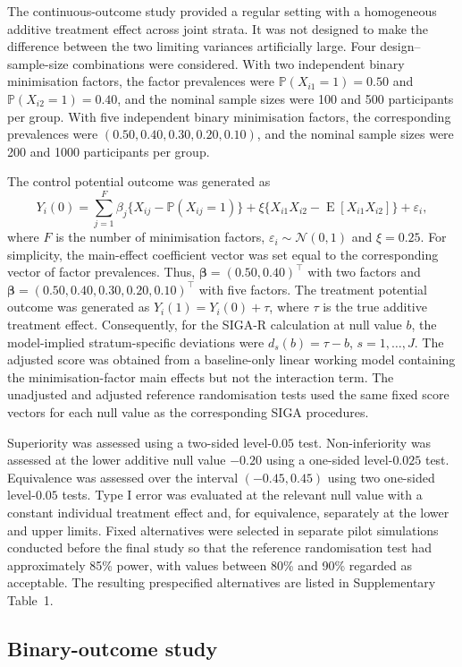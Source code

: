 \documentclass[12pt,a4paper]{article}
\theoremstyle{definition}
\theoremstyle{remark}\newtheorem{remark}{Remark}
\numberwithin{equation}{section}
\newcommand{\E}{\operatorname{E}}
\newcommand{\Pbb}{\mathbb P}
\begin{document}
The continuous-outcome study provided a regular setting with a homogeneous additive treatment effect across joint strata. It was not designed to make the difference between the two limiting variances artificially large. Four design--sample-size combinations were considered. With two independent binary minimisation factors, the factor prevalences were $\Pbb(X_{i1}=1)=0.50$ and $\Pbb(X_{i2}=1)=0.40$, and the nominal sample sizes were 100 and 500 participants per group. With five independent binary minimisation factors, the corresponding prevalences were
$(0.50,0.40,0.30,0.20,0.10)$, and the nominal sample sizes were 200 and 1000 participants per group.

The control potential outcome was generated as
\[
Y_i(0)
=
\sum_{j=1}^F
\beta_j\{X_{ij}-\Pbb(X_{ij}=1)\}
+
\xi\{X_{i1}X_{i2}-\E[X_{i1}X_{i2}]\}
+
\varepsilon_i,
\]
where $F$ is the number of minimisation factors, $\varepsilon_i\sim\mathcal N(0,1)$ and $\xi=0.25$. For simplicity, the main-effect coefficient vector was set equal to the corresponding vector of factor prevalences. Thus, $\bm\beta=(0.50,0.40)^\top$ with two factors and
$\bm\beta=(0.50,0.40,0.30,0.20,0.10)^\top$ with five factors. The treatment potential outcome was generated as $Y_i(1)=Y_i(0)+\tau$, where $\tau$ is the true additive treatment effect. Consequently, for the SIGA-R calculation at null value $b$, the model-implied stratum-specific deviations were $d_s(b)=\tau-b$, $s=1,\ldots,J$. The adjusted score was obtained from a baseline-only linear working model containing the minimisation-factor main effects but not the interaction term. The unadjusted and adjusted reference randomisation tests used the same fixed score vectors for each null value as the corresponding SIGA procedures.

Superiority was assessed using a two-sided level-$0.05$ test. Non-inferiority was assessed at the lower additive null value $-0.20$ using a one-sided level-$0.025$ test. Equivalence was assessed over the interval $(-0.45,0.45)$ using two one-sided level-$0.05$ tests. Type I error was evaluated at the relevant null value with a constant individual treatment effect and, for equivalence, separately at the lower and upper limits. Fixed alternatives were selected in separate pilot simulations conducted before the final study so that the reference randomisation test had approximately 85\% power, with values between 80\% and 90\% regarded as acceptable. The resulting prespecified alternatives are listed in Supplementary Table~1.

\subsection{Binary-outcome study}\label{sec:supp-binary-model}
\end{document}
